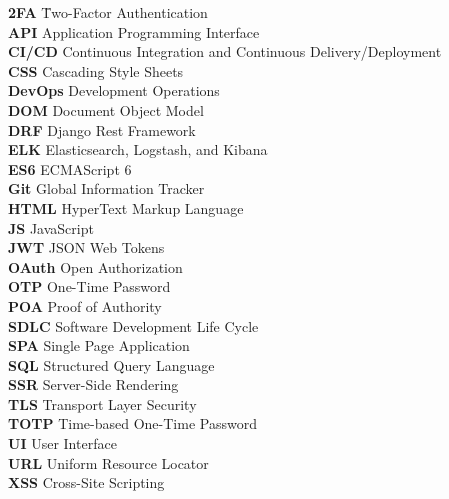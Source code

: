 \documentclass[a4paper, 11pt, oneside]{Thesis}  %
\begin{document}
\begin{tabbing}
    \textbf{2FA} \hspace{1cm} \= Two-Factor Authentication\\
    \textbf{API} \> Application Programming Interface\\
    \textbf{CI/CD} \> Continuous Integration and Continuous Delivery/Deployment\\
    \textbf{CSS} \> Cascading Style Sheets\\
    \textbf{DevOps} \> Development Operations\\
    \textbf{DOM} \> Document Object Model\\
    \textbf{DRF} \> Django Rest Framework\\
    \textbf{ELK} \> Elasticsearch, Logstash, and Kibana\\
    \textbf{ES6} \> ECMAScript 6\\
    \textbf{Git} \> Global Information Tracker\\
    \textbf{HTML} \> HyperText Markup Language\\
    \textbf{JS} \> JavaScript\\
    \textbf{JWT} \> JSON Web Tokens\\
    \textbf{OAuth} \> Open Authorization\\
    \textbf{OTP} \> One-Time Password\\
    \textbf{POA} \> Proof of Authority\\
    \textbf{SDLC} \> Software Development Life Cycle\\
    \textbf{SPA} \> Single Page Application\\
    \textbf{SQL} \> Structured Query Language\\
    \textbf{SSR} \> Server-Side Rendering\\
    \textbf{TLS} \> Transport Layer Security\\
    \textbf{TOTP} \> Time-based One-Time Password\\
    \textbf{UI} \> User Interface\\
    \textbf{URL} \> Uniform Resource Locator\\
    \textbf{XSS} \> Cross-Site Scripting\\
\end{tabbing}






\mainmatter	  %
\end{document}
